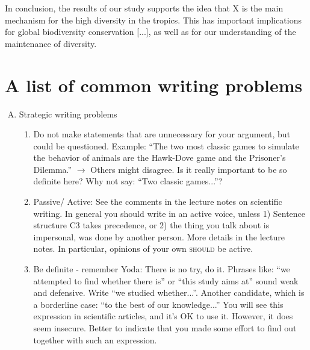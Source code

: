 \documentclass{tufte-book}
\begin{document}
In conclusion, the results of our study supports the idea that X is the main mechanism for the high diversity in the tropics. This has important implications for global biodiversity conservation [...], as well as for our understanding of the maintenance of diversity.

\section{A list of common writing problems}


\begin{enumerate}[(A)]


\item Strategic writing problems
\begin{enumerate}
	\item Do not make statements that are unnecessary for your argument, but could be questioned. 
	Example: ``The two most classic games to simulate the behavior of animals are the Hawk-Dove game and the Prisoner's Dilemma.'' $\rightarrow$ Others might disagree. Is it really important to be so definite here? Why not say: ``Two classic games...''?
	\item Passive/ Active: See the comments in the lecture notes on scientific writing. In general you should write in an active voice, unless  1) Sentence structure C3 takes precedence, or 2) the thing you talk about is impersonal, was done by another person. More details in the lecture notes. In particular, opinions of your own \textsc{should} be active.
	\item Be definite - remember Yoda: There is no try, do it. Phrases like: ``we attempted to find whether there is'' or ``this study aims at'' sound weak and defensive. Write ``we studied whether...''. Another candidate, which is a borderline case: ``to the best of our knowledge...'' You will see this expression in scientific articles, and it's OK to use it. However, it does seem insecure. Better to indicate that you made some effort to find out together with such an expression. 	
	
 

\end{enumerate}


\end{enumerate}
\end{document}
